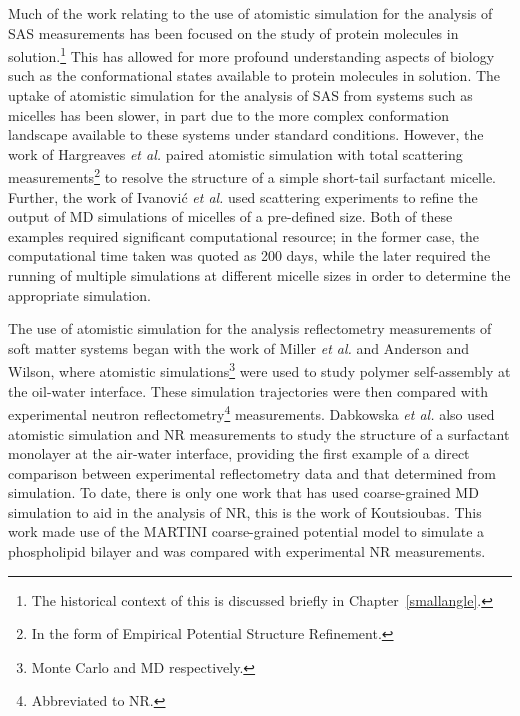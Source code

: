 Much of the work relating to the use of atomistic simulation for the analysis of SAS measurements has been focused on the study of protein molecules in solution.\footnote{The historical context of this is discussed briefly in Chapter~\ref{smallangle}.}
This has allowed for more profound understanding aspects of biology such as the conformational states available to protein molecules in solution.\autocite{bowerman_determining_2017}
The uptake of atomistic simulation for the analysis of SAS from systems such as micelles has been slower, in part due to the more complex conformation landscape available to these systems under standard conditions.
However, the work of Hargreaves \emph{et al.} paired atomistic simulation with total scattering measurements\footnote{In the form of Empirical Potential Structure Refinement.} to resolve the structure of a simple short-tail surfactant micelle.\autocite{hargreaves_atomistic_2011}
Further, the work of Ivanovi\'{c} \emph{et al.} used scattering experiments to refine the output of MD simulations of micelles of a pre-defined size.\autocite{ivanovic_temperature-dependent_2018}
Both of these examples required significant computational resource; in the former case, the computational time taken was quoted as 200 days, while the later required the running of multiple simulations at different micelle sizes in order to determine the appropriate simulation.

The use of atomistic simulation for the analysis reflectometry measurements of soft matter systems began with the work of Miller \emph{et al.} and Anderson and Wilson,\autocite{miller_monte_2003,anderson_molecular_2004} where atomistic simulations\footnote{Monte Carlo and MD respectively.} were used to study polymer self-assembly at the oil-water interface.
These simulation trajectories were then compared with experimental neutron reflectometry\footnote{Abbreviated to NR.} measurements.
Dabkowska \emph{et al.} also used atomistic simulation and NR measurements to study the structure of a surfactant monolayer at the air-water interface, providing the first example of a direct comparison between experimental reflectometry data and that determined from simulation.\autocite{dabkowska_modulation_2014}
To date, there is only one work that has used coarse-grained MD simulation to aid in the analysis of NR, this is the work of Koutsioubas.\autocite{koutsioubas_combined_2016}
This work made use of the MARTINI coarse-grained potential model to simulate a phospholipid bilayer and was compared with experimental NR measurements.
